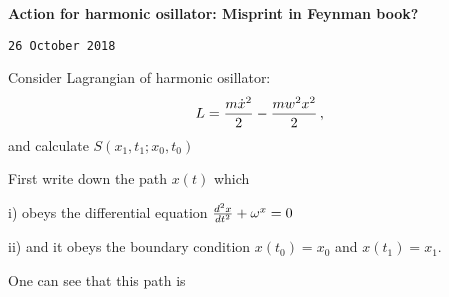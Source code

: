

\baselineskip=14pt
\def\vare {\varepsilon}
\def\A {{\bf A}}
\def\t {\tilde}
\def\a {\alpha}
\def\K {{\bf K}}
\def\N {{\bf N}}
\def\V {{\cal V}}
\def\s {{\sigma}}
\def\S {{\Sigma}}
\def\s {{\sigma}}
\def\p{\partial}
\def\vare{{\varepsilon}}
\def\Q {{\bf Q}}
\def\D {{\cal D}}
\def\G {{\Gamma}}
\def\C {{\bf C}}
\def\M {{\cal M}}
\def\Z {{\bf Z}}
\def\U  {{\cal U}}
\def\H {{\cal H}}
\def\R  {{\bf R}}
\def\S  {{\bf S}}
\def\E  {{\bf E}}
\def\l {\lambda}
\def\ll {{\bf l}}
\def\degree {{\bf {\rm degree}\,\,}}
\def \finish {${\,\,\vrule height1mm depth2mm width 8pt}$}
\def \m {\medskip}
\def\p {\partial}
\def\r {{\bf r}}
\def\pt {{\bf p}}
\def\v {{\bf v}}
\def\n {{\bf n}}
\def\t {{\bf t}}
\def\b {{\bf b}}
\def\c {{\bf c }}
\def\e{{\bf e}}
\def\ac {{\bf a}}
\def \X   {{\bf X}}
\def \Y   {{\bf Y}}
\def \x   {{\bf x}}
\def \y   {{\bf y}}
\def \G{{\cal G}}
\def\w {{\omega}}
\def \Tr  {{\rm Tr\,}}
\def\V {{\cal V}}





   {\bf Action for harmonic osillator: Misprint in Feynman book?}

{\tt 26 October 2018}

  Consider Lagrangian of harmonic osillator:
        $$
  L={m\dot x^2\over 2}-{mw^2x^2\over 2}\,,
         $$
and calculate $S(x_1,t_1;x_0,t_0)$
        
First write down the path  $x(t)$
which

i) obeys the differential equation ${d^2 x\over dt^2}+\w^x=0$

ii) and it obeys the boundary condition
      $x(t_0)=x_0$ and $x(t_1)=x_1$.

One can see that this path is 

